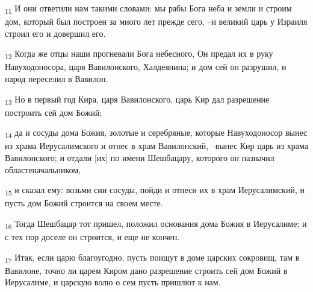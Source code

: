 \begin{tcolorbox}
\textsubscript{11} И они ответили нам такими словами: мы рабы Бога неба и земли и строим дом, который был построен за много лет прежде сего, --и великий царь у Израиля строил его и довершил его.
\end{tcolorbox}
\begin{tcolorbox}
\textsubscript{12} Когда же отцы наши прогневали Бога небесного, Он предал их в руку Навуходоносора, царя Вавилонского, Халдеянина; и дом сей он разрушил, и народ переселил в Вавилон.
\end{tcolorbox}
\begin{tcolorbox}
\textsubscript{13} Но в первый год Кира, царя Вавилонского, царь Кир дал разрешение построить сей дом Божий;
\end{tcolorbox}
\begin{tcolorbox}
\textsubscript{14} да и сосуды дома Божия, золотые и серебряные, которые Навуходоносор вынес из храма Иерусалимского и отнес в храм Вавилонский, --вынес Кир царь из храма Вавилонского; и отдали [их] по имени Шешбацару, которого он назначил областеначальником,
\end{tcolorbox}
\begin{tcolorbox}
\textsubscript{15} и сказал ему: возьми сии сосуды, пойди и отнеси их в храм Иерусалимский, и пусть дом Божий строится на своем месте.
\end{tcolorbox}
\begin{tcolorbox}
\textsubscript{16} Тогда Шешбацар тот пришел, положил основания дома Божия в Иерусалиме; и с тех пор доселе он строится, и еще не кончен.
\end{tcolorbox}
\begin{tcolorbox}
\textsubscript{17} Итак, если царю благоугодно, пусть поищут в доме царских сокровищ, там в Вавилоне, точно ли царем Киром дано разрешение строить сей дом Божий в Иерусалиме, и царскую волю о сем пусть пришлют к нам.
\end{tcolorbox}
